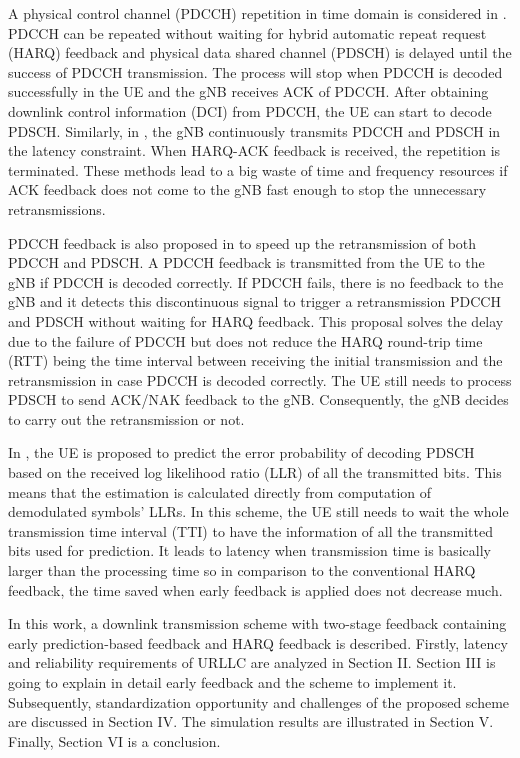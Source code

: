 \documentclass[conference]{IEEEtran}
\begin{document}
A physical control channel (PDCCH) repetition in time domain is considered in \cite{b1}. PDCCH can be repeated without waiting for hybrid automatic repeat request (HARQ) feedback and physical data shared channel (PDSCH) is delayed until the success of PDCCH transmission. The process will stop when PDCCH is decoded successfully in the UE and the gNB receives ACK of PDCCH. After obtaining downlink control information (DCI) from PDCCH, the UE can start to decode PDSCH. Similarly, in \cite{b5}, the gNB continuously transmits PDCCH and PDSCH in the latency constraint. When HARQ-ACK feedback is received, the repetition is terminated. These methods lead to a big waste of time and frequency resources if ACK feedback does not come to the gNB fast enough to stop the unnecessary retransmissions. 

PDCCH feedback is also proposed in \cite{b4} to speed up the retransmission of both PDCCH and PDSCH. A PDCCH feedback is transmitted from the UE to the gNB if PDCCH is decoded correctly. If PDCCH fails, there is no feedback to the gNB and it detects this discontinuous signal to trigger a retransmission PDCCH and PDSCH without waiting for HARQ feedback. This proposal solves the delay due to the failure of PDCCH but does not reduce the HARQ round-trip time (RTT) being the time interval between receiving the initial transmission and the retransmission in case PDCCH is decoded correctly. The UE still needs to process PDSCH to send ACK/NAK feedback to the gNB. Consequently, the gNB decides to carry out the retransmission or not.

In \cite{b2}, the UE is proposed to predict the error probability of decoding PDSCH based on the received log likelihood ratio (LLR) of all the transmitted bits. This means that the estimation is calculated directly from computation of demodulated symbols' LLRs. In this scheme, the UE still needs to wait the whole transmission time interval (TTI) to have the information of all the transmitted bits used for prediction. It leads to latency when transmission time is basically larger than the processing time so in comparison to the conventional HARQ feedback, the time saved when early feedback is applied does not decrease much.

In this work, a downlink transmission scheme with two-stage feedback containing early prediction-based feedback and HARQ feedback is described. Firstly, latency and reliability requirements of URLLC are analyzed in Section II. Section III is going to explain in detail early feedback and the scheme to implement it. Subsequently, standardization opportunity and challenges of the proposed scheme are discussed in Section IV. The simulation results are illustrated in Section V. Finally, Section VI is a conclusion.
\end{document}
